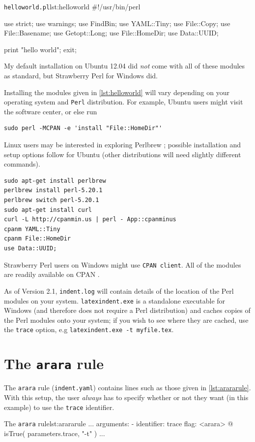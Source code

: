 \documentclass[11pt]{article}
\begin{document}
\begin{cmhlistings}[language=Perl]{\lstinline!helloworld.pl!}{lst:helloworld}
#!/usr/bin/perl

use strict;
use warnings;
use FindBin;
use YAML::Tiny;
use File::Copy;
use File::Basename;
use Getopt::Long;
use File::HomeDir;
use Data::UUID;

print "hello world";
exit;
\end{cmhlistings}
My default installation on Ubuntu 12.04 did \emph{not} come
with all of these modules as standard, but Strawberry Perl for Windows \cite{strawberryperl}
did.

Installing the modules given in \cref{lst:helloworld} will vary depending on your
operating system and \lstinline!Perl! distribution. For example, Ubuntu users
might visit the software center, or else run
\begin{lstlisting}[numbers=none]
sudo perl -MCPAN -e 'install "File::HomeDir"'
\end{lstlisting}

Linux users may be interested in exploring Perlbrew \cite{perlbrew}; possible installation and setup 
options follow for Ubuntu (other distributions will need slightly different commands).
\begin{lstlisting}[numbers=none]
sudo apt-get install perlbrew
perlbrew install perl-5.20.1
perlbrew switch perl-5.20.1
sudo apt-get install curl
curl -L http://cpanmin.us | perl - App::cpanminus
cpanm YAML::Tiny
cpanm File::HomeDir
use Data::UUID;
\end{lstlisting}

Strawberry Perl users on Windows might use
\lstinline!CPAN client!. All of the modules are readily available on CPAN \cite{cpan}.

As of Version 2.1,  \lstinline!indent.log! will contain details of the location
of the Perl modules on your system.  \lstinline!latexindent.exe! is a standalone
executable for Windows (and therefore does not require a Perl distribution) and caches copies of the Perl modules onto your system; if you
wish to see where they are cached, use the  \lstinline!trace! option, e.g  \lstinline!latexindent.exe -t myfile.tex!.

\section{The \lstinline!arara! rule}
The \lstinline!arara! rule (\lstinline!indent.yaml!) contains lines such as those
given in \cref{lst:arararule}. With this setup, the user \emph{always} has
to specify whether or not they want (in this example) to use the \lstinline!trace!
identifier.
\begin{cmhlistings}[style=yaml,numbers=none]{The \lstinline!arara! rule}{lst:arararule}
...
arguments:
- identifier: trace
  flag: <arara> @{ isTrue( parameters.trace, "-t" ) }
...
\end{cmhlistings}
\end{document}
